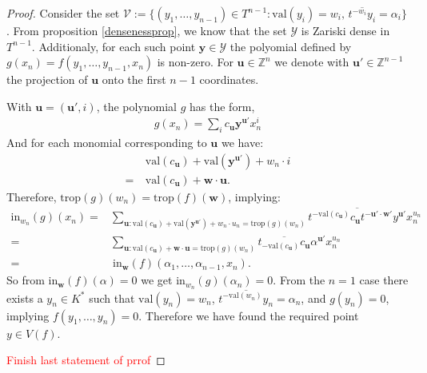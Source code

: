 \begin{proof}
        \par Consider the set $\mathcal{V} := \{(y_{1},\dots, y_{n-1})\in T^{n-1}: \text{val}(y_{i}) = w_{i},\,\overline{ t^{-w_{i}}y_{i}} = \alpha_{i} \}$.
        From proposition \ref{densenessprop}, we know that the set $\mathcal{Y}$ is Zariski dense in $T^{n-1}$.
        Additionaly, for each such point $\textbf{y}\in \mathcal{Y}$ the polyomial defined by $g(x_{n}) = f(y_{1},\dots, y_{n-1}, x_{n})$ is non-zero.
        For $\textbf{u} \in \mathbb{Z}^{n}$ we denote with $\textbf{u}'\in \mathbb{Z}^{n-1}$ the projection of $\textbf{u}$ onto the first $n-1$ coordinates. 
        \par With $\textbf{u} = (\textbf{u}',i)$, the polynomial $g$ has the form,
        \begin{align*}
            g(x_{n}) = \sum_{i} c_{\textbf{u}}\textbf{y}^{\textbf{u}'}x_{n}^{i}
        \end{align*}
        And for each monomial corresponding to $\textbf{u}$ we have:
        \begin{align*}
            &~ \text{val}(c_{\textbf{u}}) + \text{val}(\textbf{y}^{\textbf{u}'}) + w_{n}\cdot i\\
            =& ~\text{val}(c_{\textbf{u}}) + \textbf{w} \cdot \textbf{u}.
        \end{align*}
        Therefore, $\text{trop}(g)(w_{n}) = \text{trop}(f)(\textbf{w})$, implying:
        \begin{align*}
            \text{in}_{w_{n}}(g)(x_{n}) =& \sum_{\textbf{u}: \text{val}(c_{\textbf{u}}) + \text{val}(\textbf{y}^{\textbf{u}'}) + w_{n}\cdot u_{n} = \text{trop}(g)(w_{n})} \overline{t^{-\text{val}(c_{\textbf{u}})}c_{\textbf{u}}t^{-\textbf{u}'\cdot \textbf{w}'}y^{\textbf{u}'}}x^{u_n}_{n} \\
            =& \sum_{\textbf{u}: \text{val}(c_{\textbf{u}}) + \textbf{w} \cdot \textbf{u} = \text{trop}(g)(w_{n})}\overline{t_{-\text{val}(c_{\textbf{u}})}c_{\textbf{u}}}\alpha^{\textbf{u}'}x^{u_{n}}_{n}\\
            =& ~ \text{in}_{\textbf{w}}(f)(\alpha_{1}, \dots, \alpha_{n-1}, x_{n}).
        \end{align*}
        So from $\text{in}_{\textbf{w}}(f)(\alpha) = 0$ we get $\text{in}_{w_{n}}(g)(\alpha_{n}) = 0$.
        From the $n=1$ case there exists a $y_{n} \in K^{*}$ such that $\text{val}(y_n) = w_n$, $\overline{t^{-\text{val}(w_{n})}y_{n}} = \alpha_{n}$, and $g(y_{n}) = 0$, implying $f(y_1,\dots,y_n) = 0$.
        Therefore we have found the required point $y \in V(f)$.
        \par \textcolor{red}{Finish last statement of prrof}

    \end{proof}

